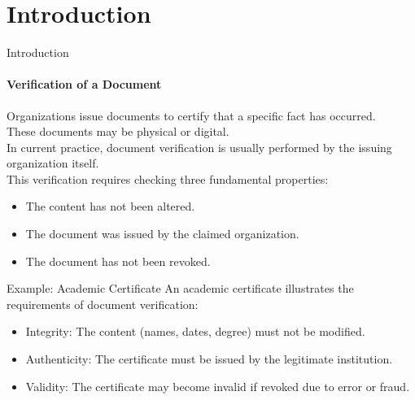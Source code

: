 
\section{Introduction}



\begin{frame}{Introduction}
    \framesubtitle{Verification of a Document}

Organizations issue documents to certify that a specific fact has occurred.\\
These documents may be physical or digital.\\
\vspace*{0.2cm}
In current practice, document verification is usually performed by the issuing organization itself.\\
\vspace*{0.2cm}
This verification requires checking three fundamental properties:
\vspace*{0.2cm}
\begin{itemize}
    \item The content has not been altered.
    \item The document was issued by the claimed organization.
    \item The document has not been revoked.
\end{itemize}
\end{frame}


\begin{frame}
\begin{block}{Example: Academic Certificate}
\vspace*{0.2cm}
An academic certificate illustrates the requirements of document verification:
\vspace*{0.2cm}
\begin{itemize}
    \item Integrity: The content (names, dates, degree) must not be modified.
    \item Authenticity: The certificate must be issued by the legitimate institution.
    \item Validity: The certificate may become invalid if revoked due to error or fraud.
\end{itemize}
\end{block}
\end{frame}


